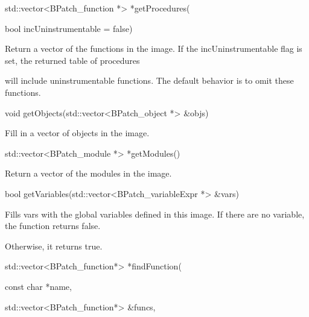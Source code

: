 {{std::vector<BPatch_function *> *getProcedures(}



{

bool incUninstrumentable = false)}



{

Return a vector of the functions in the image. If the incUninstrumentable flag is set, the returned table of procedures

will include uninstrumentable functions. The default behavior is to omit these functions.}



{

void getObjects(std::vector<BPatch_object *> &objs)}



{

Fill in a vector of objects in the image.





\bigskip



{

std::vector<BPatch_module *> *getModules()}



{

Return a vector of the modules in the image.}



{

bool getVariables(std::vector<BPatch_variableExpr *> &vars)}



{

Fills vars with the global variables defined in this image. If there are no variable, the function returns false.

Otherwise, it returns true.}



{

std::vector<BPatch_function*> *findFunction(}



{

const char *name,}



{

std::vector<BPatch_function*> &funcs,}



{

}}}

